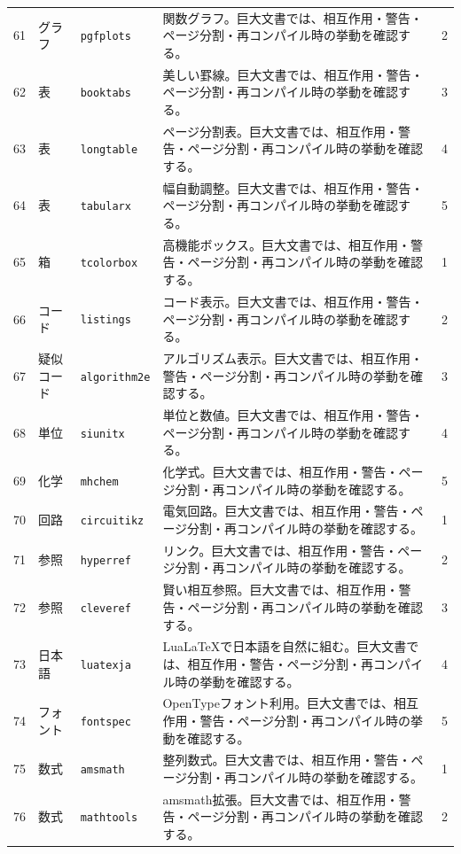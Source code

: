 \documentclass[12pt,a4paper,openany]{ltjsbook}
\theoremstyle{definition}
\theoremstyle{plain}
\theoremstyle{remark}
\begin{document}
\begin{landscape}
\begin{longtable}{llp{55mm}p{80mm}r}
61 & グラフ & \texttt{pgfplots} & 関数グラフ。巨大文書では、相互作用・警告・ページ分割・再コンパイル時の挙動を確認する。 & 2\\
62 & 表 & \texttt{booktabs} & 美しい罫線。巨大文書では、相互作用・警告・ページ分割・再コンパイル時の挙動を確認する。 & 3\\
63 & 表 & \texttt{longtable} & ページ分割表。巨大文書では、相互作用・警告・ページ分割・再コンパイル時の挙動を確認する。 & 4\\
64 & 表 & \texttt{tabularx} & 幅自動調整。巨大文書では、相互作用・警告・ページ分割・再コンパイル時の挙動を確認する。 & 5\\
65 & 箱 & \texttt{tcolorbox} & 高機能ボックス。巨大文書では、相互作用・警告・ページ分割・再コンパイル時の挙動を確認する。 & 1\\
66 & コード & \texttt{listings} & コード表示。巨大文書では、相互作用・警告・ページ分割・再コンパイル時の挙動を確認する。 & 2\\
67 & 疑似コード & \texttt{algorithm2e} & アルゴリズム表示。巨大文書では、相互作用・警告・ページ分割・再コンパイル時の挙動を確認する。 & 3\\
68 & 単位 & \texttt{siunitx} & 単位と数値。巨大文書では、相互作用・警告・ページ分割・再コンパイル時の挙動を確認する。 & 4\\
69 & 化学 & \texttt{mhchem} & 化学式。巨大文書では、相互作用・警告・ページ分割・再コンパイル時の挙動を確認する。 & 5\\
70 & 回路 & \texttt{circuitikz} & 電気回路。巨大文書では、相互作用・警告・ページ分割・再コンパイル時の挙動を確認する。 & 1\\
71 & 参照 & \texttt{hyperref} & リンク。巨大文書では、相互作用・警告・ページ分割・再コンパイル時の挙動を確認する。 & 2\\
72 & 参照 & \texttt{cleveref} & 賢い相互参照。巨大文書では、相互作用・警告・ページ分割・再コンパイル時の挙動を確認する。 & 3\\
73 & 日本語 & \texttt{luatexja} & LuaLaTeXで日本語を自然に組む。巨大文書では、相互作用・警告・ページ分割・再コンパイル時の挙動を確認する。 & 4\\
74 & フォント & \texttt{fontspec} & OpenTypeフォント利用。巨大文書では、相互作用・警告・ページ分割・再コンパイル時の挙動を確認する。 & 5\\
75 & 数式 & \texttt{amsmath} & 整列数式。巨大文書では、相互作用・警告・ページ分割・再コンパイル時の挙動を確認する。 & 1\\
76 & 数式 & \texttt{mathtools} & amsmath拡張。巨大文書では、相互作用・警告・ページ分割・再コンパイル時の挙動を確認する。 & 2\\

\end{longtable}
\end{landscape}
\end{document}
